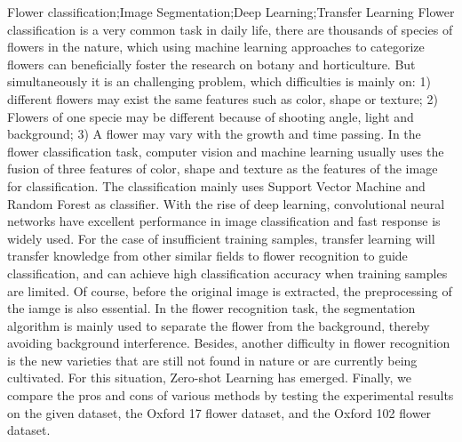 \documentclass[supercite]{HustGraduPaper}
\begin{document}
\begin{sloppypar}
\begin{enabstract}{Flower classification;Image Segmentation;Deep Learning;Transfer Learning}
		Flower classification is a very common task in daily life, there are thousands of species of flowers in the nature, which using machine learning approaches to categorize flowers can beneficially foster the research on botany and horticulture. But simultaneously it is an challenging problem, which difficulties is mainly on: 1) different flowers may exist the same features such as color, shape or texture; 2) Flowers of one specie may be different because of shooting angle, light and background; 3) A flower may vary with the growth and time passing. In the flower classification task, computer vision and machine learning usually uses the fusion of three features of color, shape and texture as the features of the image for classification. The classification mainly uses Support Vector Machine and Random Forest as classifier. With the rise of deep learning, convolutional neural networks have excellent performance in image classification and fast response is widely used. For the case of insufficient training samples, transfer learning will transfer knowledge from other similar fields to flower recognition to guide classification, and can achieve high classification accuracy when training samples are limited. Of course, before the original image is extracted, the preprocessing of the iamge is also essential. In the flower recognition task, the segmentation algorithm is mainly used to separate the flower from the background, thereby avoiding background interference. Besides, another difficulty in flower recognition is the new varieties that are still not found in nature or are currently being cultivated. For this situation, Zero-shot Learning has emerged. Finally, we compare the pros and cons of various methods by testing the experimental results on the given dataset, the Oxford 17 flower dataset, and the Oxford 102 flower dataset.
	\end{enabstract}
	\clearpage
    \phantom{s}
    \thispagestyle{empty}
	\tableofcontents
	

\end{sloppypar}
\end{document}
